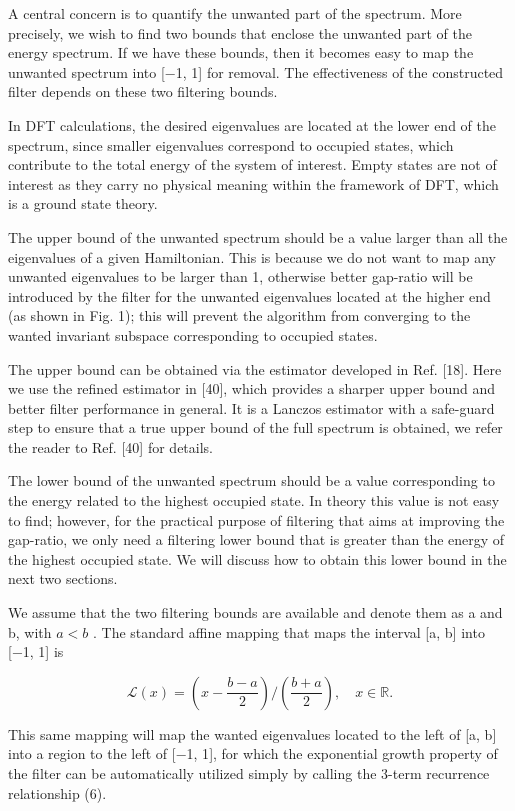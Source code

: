 \documentclass[
  10
]{article}
\begin{document}
A central concern is to quantify the unwanted part of the spectrum. More
precisely, we wish to find two bounds that enclose the unwanted part of
the energy spectrum. If we have these bounds, then it becomes easy to
map the unwanted spectrum into {[}−1, 1{]} for removal. The
effectiveness of the constructed filter depends on these two filtering
bounds.

In DFT calculations, the desired eigenvalues are located at the lower
end of the spectrum, since smaller eigenvalues correspond to occupied
states, which contribute to the total energy of the system of interest.
Empty states are not of interest as they carry no physical meaning
within the framework of DFT, which is a ground state theory.

The upper bound of the unwanted spectrum should be a value larger than
all the eigenvalues of a given Hamiltonian. This is because we do not
want to map any unwanted eigenvalues to be larger than 1, otherwise
better gap-ratio will be introduced by the filter for the unwanted
eigenvalues located at the higher end (as shown in Fig. 1); this will
prevent the algorithm from converging to the wanted invariant subspace
corresponding to occupied states.

The upper bound can be obtained via the estimator developed in Ref.
{[}18{]}. Here we use the refined estimator in {[}40{]}, which provides
a sharper upper bound and better filter performance in general. It is a
Lanczos estimator with a safe-guard step to ensure that a true upper
bound of the full spectrum is obtained, we refer the reader to Ref.
{[}40{]} for details.

The lower bound of the unwanted spectrum should be a value corresponding
to the energy related to the highest occupied state. In theory this
value is not easy to find; however, for the practical purpose of
filtering that aims at improving the gap-ratio, we only need a filtering
lower bound that is greater than the energy of the highest occupied
state. We will discuss how to obtain this lower bound in the next two
sections.

We assume that the two filtering bounds are available and denote them as
a and b, with \(a < b\) . The standard affine mapping that maps the
interval {[}a, b{]} into {[}−1, 1{]} is

\[
\mathcal {L} (x) = \left(x - \frac {b - a}{2}\right) / \left(\frac {b + a}{2}\right), \quad x \in \mathbb {R}. \tag {7}
\]

This same mapping will map the wanted eigenvalues located to the left of
{[}a, b{]} into a region to the left of {[}−1, 1{]}, for which the
exponential growth property of the filter can be automatically utilized
simply by calling the 3-term recurrence relationship (6).
\end{document}
